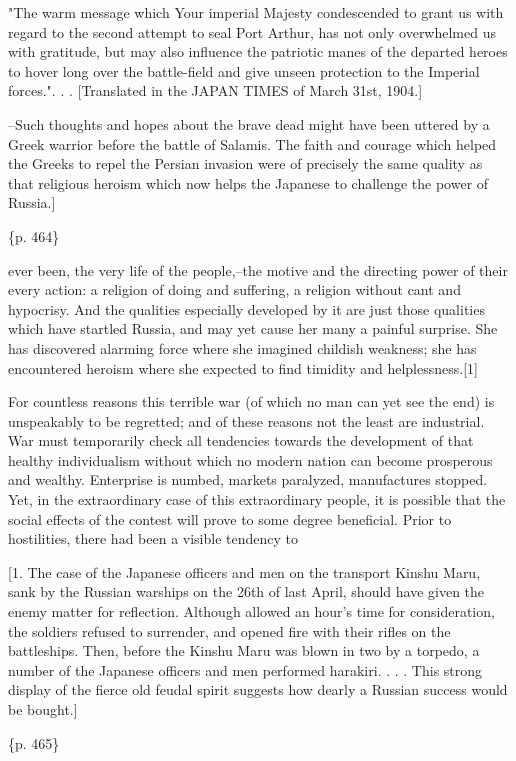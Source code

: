 "The warm message which Your imperial Majesty condescended to grant us with regard to the second attempt to seal Port Arthur, has not only overwhelmed us with gratitude, but may also influence the patriotic manes of the departed heroes to hover long over the battle-field and give unseen protection to the Imperial forces.". . . [Translated in the JAPAN TIMES of March 31st, 1904.]

--Such thoughts and hopes about the brave dead might have been uttered by a Greek warrior before the battle of Salamis. The faith and courage which helped the Greeks to repel the Persian invasion were of precisely the same quality as that religious heroism which now helps the Japanese to challenge the power of Russia.]

\{p. 464\}

ever been, the very life of the people,--the motive and the directing power of their every action: a religion of doing and suffering, a religion without cant and hypocrisy. And the qualities especially developed by it are just those qualities which have startled Russia, and may yet cause her many a painful surprise. She has discovered alarming force where she imagined childish weakness; she has encountered heroism where she expected to find timidity and helplessness.[1]


For countless reasons this terrible war (of which no man can yet see the end) is unspeakably to be regretted; and of these reasons not the least are industrial. War must temporarily check all tendencies towards the development of that healthy individualism without which no modern nation can become prosperous and wealthy. Enterprise is numbed, markets paralyzed, manufactures stopped. Yet, in the extraordinary case of this extraordinary people, it is possible that the social effects of the contest will prove to some degree beneficial. Prior to hostilities, there had been a visible tendency to

[1. The case of the Japanese officers and men on the transport Kinshu Maru, sank by the Russian warships on the 26th of last April, should have given the enemy matter for reflection. Although allowed an hour's time for consideration, the soldiers refused to surrender, and opened fire with their rifles on the battleships. Then, before the Kinshu Maru was blown in two by a torpedo, a number of the Japanese officers and men performed harakiri. . . . This strong display of the fierce old feudal spirit suggests how dearly a Russian success would be bought.]

\{p. 465\}

